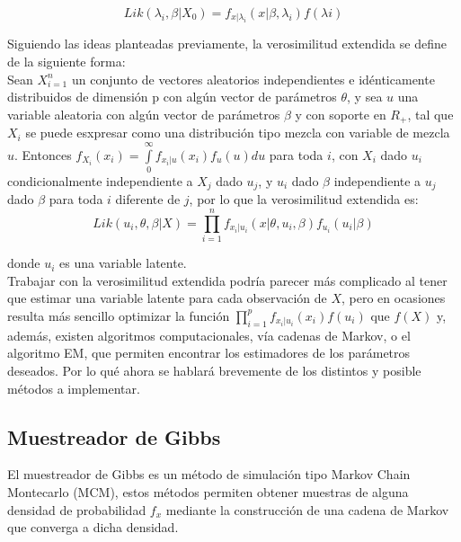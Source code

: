 \begin{equation*}
Lik(\lambda_{i},\beta|X_{0})=f_{x|\lambda_{i}}(x|\beta,\lambda_{i})f(\lambda{i})
\end{equation*}
	
	Siguiendo las ideas planteadas previamente, la verosimilitud extendida se define de la siguiente forma:\\
	
	Sean ${X}_{i=1}^{n}$ un conjunto de vectores aleatorios independientes e idénticamente distribuidos de dimensión p con algún vector de parámetros $\theta$, y sea $u$ una variable aleatoria con algún vector de parámetros $\beta$ y con soporte en $R_{+}$, tal que $X_{i}$ se puede esxpresar como una distribución tipo mezcla con variable de mezcla $u$. Entonces  $f_{X_{i}}(x_{i})=\underset{0}{\overset{\infty }{\int }}f_{x_{i}|u}(x_{i})f_{u}(u)du$ para toda $i$, con $X_{i}$ dado $u_{i}$ condicionalmente independiente a $X_{j}$ dado $u_{j}$, y $ u_{i}$ dado $\beta$ independiente a $u_{j}$ dado $\beta$ para toda $i$ diferente de $j$, por lo que la verosimilitud extendida es:\\
	\begin{equation*}
	Lik(u_{i},\theta,\beta |X)=\prod_{i=1}^{n}f_{x_{i}|u_{i}}(x|\theta, u_{i},\beta)f_{u_{i}}(u_{i}|\beta)
	\end{equation*}
	
	
	donde $u_{i}$ es una variable latente.\\
	
	Trabajar con la verosimilitud extendida podría parecer más complicado al tener que estimar una variable latente para cada observación de $X$, pero en ocasiones resulta más sencillo optimizar la función $\prod_{i=1}^{p}f_{x_{i}|u_{i}}(x_{i})f(u_{i})$ que $f(X)$ y, además, existen algoritmos computacionales, vía cadenas de Markov, o el algoritmo EM, que permiten encontrar los estimadores de los parámetros deseados. Por lo qué ahora se hablará brevemente de los distintos y posible métodos a implementar.



\subsection{Muestreador de Gibbs}
El muestreador de Gibbs es un método de simulación tipo Markov Chain Montecarlo (MCM), estos métodos permiten obtener muestras de alguna densidad de probabilidad $f_{x}$ mediante la construcción de una cadena de Markov que converga a dicha densidad.\\ 

